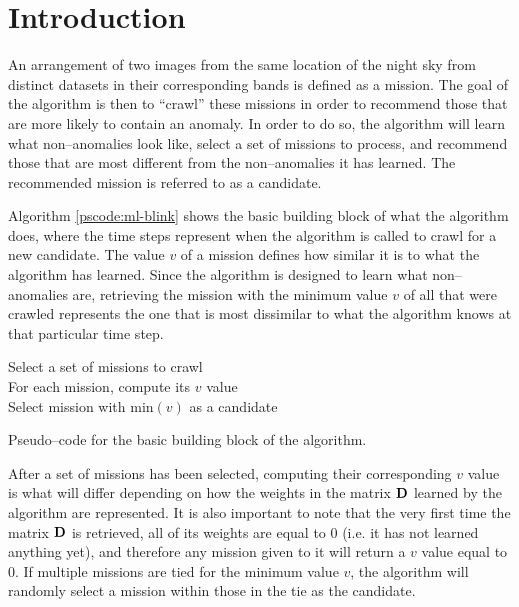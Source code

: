 \section{Introduction} \label{sect:meth:intro}

An arrangement of two images from the same location of the night sky from distinct datasets in their corresponding bands is defined as a mission. The goal of the \mlblink algorithm is then to ``crawl'' these missions in order to recommend those that are more likely to contain an anomaly. In order to do so, the \mlblink algorithm will learn what non--anomalies look like,  select a set of missions to process, and recommend those that are most different from the non--anomalies it has learned. The recommended mission is referred to as a candidate.  \newline

Algorithm \ref{pscode:ml-blink} shows the basic building block of what the \mlblink algorithm does, where the time steps represent when the algorithm is called to crawl for a new candidate. The value $v$ of a mission defines how similar it is to what the \mlblink algorithm has learned. Since the \mlblink algorithm is designed to learn what non--anomalies are, retrieving the mission with the minimum value $v$ of all that were crawled represents the one that is most dissimilar to what the \mlblink algorithm knows at that particular time step.

\vspace{0.4cm}
\begin{algorithm}[H]
    \SetAlgoLined
        \FMain{} {
             {
                Select a set of missions to crawl \\
                For each mission, compute its $v$ value \\
                Select mission with $\text{min}(v)$ as a candidate \\
            }
        }
    \caption{Pseudo--code for the basic building block of the \mlblink algorithm.}
    \label{pscode:ml-blink}
\end{algorithm}
\vspace{0.4cm}

After a set of missions has been selected, computing their corresponding $v$ value is what will differ depending on how the weights in the matrix $\boldsymbol{\mathbf{D}}$ learned by the algorithm are represented. It is also important to note that the very first time the matrix $\boldsymbol{\mathbf{D}}$ is retrieved, all of its weights are equal to $0$ (i.e. it has not learned anything yet), and therefore any mission given to it will return a $v$ value equal to $0$. If multiple missions are tied for the minimum value $v$, the \mlblink algorithm will randomly select a mission within those in the tie as the candidate.